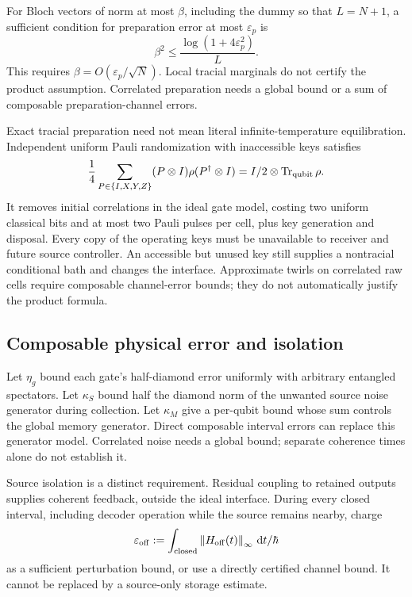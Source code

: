 \documentclass[11pt]{article}
\numberwithin{equation}{section}
\theoremstyle{remark}
\newcommand{\Tr}{\operatorname{Tr}}
\newcommand{\norm}[1]{\left\lVert#1\right\rVert}
\newcommand{\dd}{\,\mathrm d}
\newcommand{\eps}{\varepsilon}
\begin{document}
For Bloch vectors of norm at most \(\beta\), including the dummy so that
\(L=N+1\), a sufficient condition for preparation error at most \(\eps_p\) is
\begin{equation}
 \beta^2\le\frac{\log(1+4\eps_p^2)}{L}.
 \label{eq:prep-tolerance}
\end{equation}
This requires \(\beta=O(\eps_p/\sqrt N)\). Local tracial marginals do not
certify the product assumption. Correlated preparation needs a global bound
or a sum of composable preparation-channel errors.

Exact tracial preparation need not mean literal infinite-temperature
equilibration. Independent uniform Pauli randomization with inaccessible
keys satisfies
\[
 \frac14\sum_{P\in\{I,X,Y,Z\}}
   (P\otimes I)\rho(P^\dagger\otimes I)
       =I/2\otimes\Tr_{\rm qubit}\rho.
\]
It removes initial correlations in the ideal gate model, costing two
uniform classical bits and at most two Pauli pulses per cell, plus key
generation and disposal. Every copy of the operating keys must be unavailable
to receiver and future source controller. An accessible but unused key
still supplies a nontracial conditional bath and changes the interface.
Approximate twirls on correlated raw cells require composable channel-error
bounds; they do not automatically justify the product formula.
\subsection{Composable physical error and isolation}
Let \(\eta_g\) bound each gate's half-diamond error uniformly with arbitrary
entangled spectators. Let \(\kappa_S\) bound half the diamond norm of the
unwanted source noise generator during collection. Let \(\kappa_M\) give a
per-qubit bound whose sum controls the global memory generator.
Direct composable interval errors can replace this generator model.
Correlated noise needs a global bound; separate coherence times alone do
not establish it.

Source isolation is a distinct requirement. Residual coupling to retained
outputs supplies coherent feedback, outside the ideal interface.
During every closed interval, including decoder operation while the source
remains nearby, charge
\begin{equation}
 \eps_{\rm off}:=
 \int_{\rm closed}\norm{H_{\rm off}(t)}_\infty\dd t/\hbar
 \label{eq:isolation}
\end{equation}
as a sufficient perturbation bound, or use a directly certified channel
bound. It cannot be replaced by a source-only storage estimate.
\end{document}
